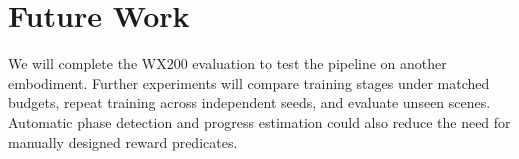 \section{Future Work}\label{sec:future}
We will complete the WX200 evaluation to test the pipeline on another embodiment. Further experiments will compare training stages under matched budgets, repeat training across independent seeds, and evaluate unseen scenes. Automatic phase detection and progress estimation could also reduce the need for manually designed reward predicates.
